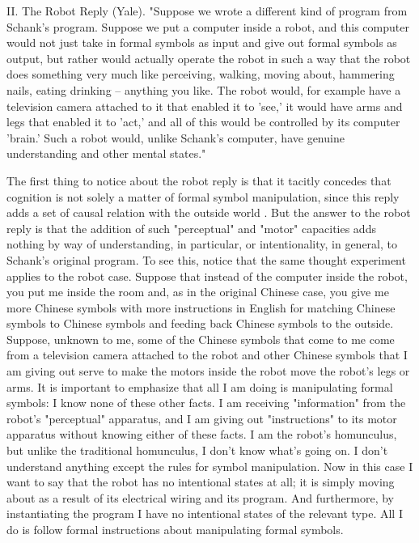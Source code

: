 II. The Robot Reply (Yale). "Suppose we wrote a different kind of program from Schank's program. Suppose
we put a computer inside a robot, and this computer would not just take in formal symbols as input and give out
formal symbols as output, but rather would actually operate the robot in such a way that the robot does
something very much like perceiving, walking, moving about, hammering nails, eating drinking -- anything you
like. The robot would, for example have a television camera attached to it that enabled it to 'see,' it would have
arms and legs that enabled it to 'act,' and all of this would be controlled by its computer 'brain.' Such a robot
would, unlike Schank's computer, have genuine understanding and other mental states."

The first thing to notice about the robot reply is that it tacitly concedes that cognition is not solely a matter of
formal symbol manipulation, since this reply adds a set of causal relation with the outside world \autocite{Fodor1}. 
But the answer to the robot reply is that the addition of such
"perceptual" and "motor" capacities adds nothing by way of understanding, in particular, or intentionality, in
general, to Schank's original program. To see this, notice that the same thought experiment applies to the robot
case. Suppose that instead of the computer inside the robot, you put me inside the room and, as in the original
Chinese case, you give me more Chinese symbols with more instructions in English for matching Chinese
symbols to Chinese symbols and feeding back Chinese symbols to the outside. Suppose, unknown to me, some
of the Chinese symbols that come to me come from a television camera attached to the robot and other Chinese symbols that I am giving out serve to make the motors inside the robot move the robot's legs or arms.
It is important to emphasize that all I am doing is manipulating formal symbols: I know none of these other facts.
I am receiving "information" from the robot's "perceptual" apparatus, and I am giving out "instructions" to its
motor apparatus without knowing either of these facts. I am the robot's homunculus, but unlike the traditional
homunculus, I don't know what's going on. I don't understand anything except the rules for symbol
manipulation. Now in this case I want to say that the robot has no intentional states at all; it is simply moving
about as a result of its electrical wiring and its program. And furthermore, by instantiating the program I have no
intentional states of the relevant type. All I do is follow formal instructions about manipulating formal symbols.

